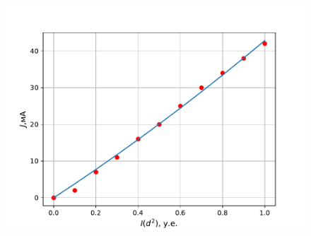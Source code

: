\begin{center}
    \begin{figure}[H]

            \includegraphics[scale=0.6]{scripts/1500} 
            \vspace{-30pt}
            \label{fig:3}

    \end{figure}
\end{center}


